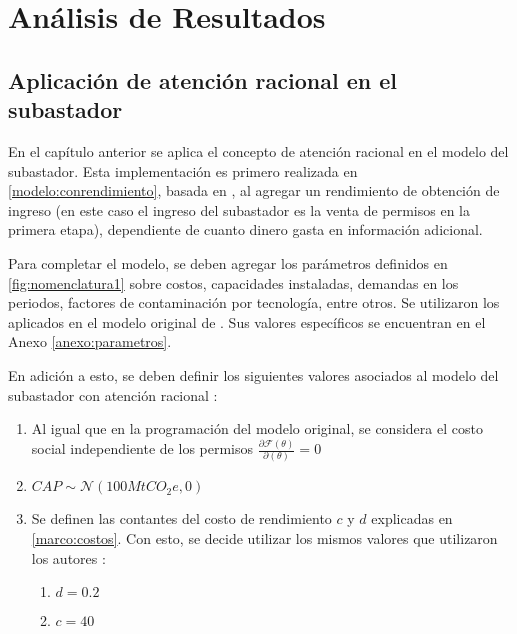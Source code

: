 
\chapter{Análisis de Resultados}
\label{c4} %

\section{Aplicación de atención racional en el subastador}

En el capítulo anterior se aplica el concepto de atención racional en el modelo del subastador. Esta implementación es primero realizada en \ref{modelo:conrendimiento}, basada en \cite{dewan_estimating_2020}, al agregar un rendimiento de obtención de ingreso (en este caso el ingreso del subastador es la venta de permisos en la primera etapa), dependiente de cuanto dinero gasta en información adicional.
\vspace{2.5mm}

Para completar el modelo, se deben agregar los parámetros definidos en \ref{fig:nomenclatura1} sobre costos, capacidades instaladas, demandas en los periodos, factores de contaminación por tecnología, entre otros. Se utilizaron los aplicados en el modelo original de \cite{amigo_two_2021}. Sus valores específicos se encuentran en el Anexo \ref{anexo:parametros}.
\vspace{2.5mm}

En adición a esto, se deben definir los siguientes valores asociados al modelo del subastador con atención racional :

\begin{enumerate}
    \item Al igual que en la programación del modelo original, se considera el costo social independiente de los permisos  $\frac{\partial\mathcal{F}(\theta)}{\partial(\theta)}=0$
    \item $CAP\sim \mathcal{N}(100MtCO_{2}e,0)$
    \item Se definen las contantes del costo de rendimiento $c$ y $d$ explicadas en \ref{marco:costos}. Con esto, se decide utilizar los mismos valores que utilizaron los autores :
    \begin{enumerate}
        \item $d = 0.2$
        \item $c = 40$
    \end{enumerate}
\end{enumerate}

